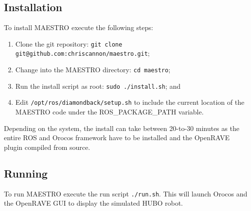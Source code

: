 \documentclass{article}
\begin{document}
\subsection{Installation}
To install MAESTRO execute the following steps:
\begin{enumerate}
    \item Clone the git repository: \texttt{git clone git@github.com:chriscannon/maestro.git};
    \item Change into the MAESTRO directory: \texttt{cd maestro};
    \item Run the install script as root: \texttt{sudo ./install.sh};
        and
    \item Edit \texttt{/opt/ros/diamondback/setup.sh} to include the
        current location of the MAESTRO code under the
        ROS\_PACKAGE\_PATH variable.
\end{enumerate}
Depending on the system, the install can take between 20-to-30 minutes
as the entire ROS and Orocos framework have to be installed and the
OpenRAVE plugin compiled from source.

\subsection{Running}
To run MAESTRO execute the run script \texttt{./run.sh}. This will
launch Orocos and the OpenRAVE GUI to display the simulated HUBO robot.
\end{document}
